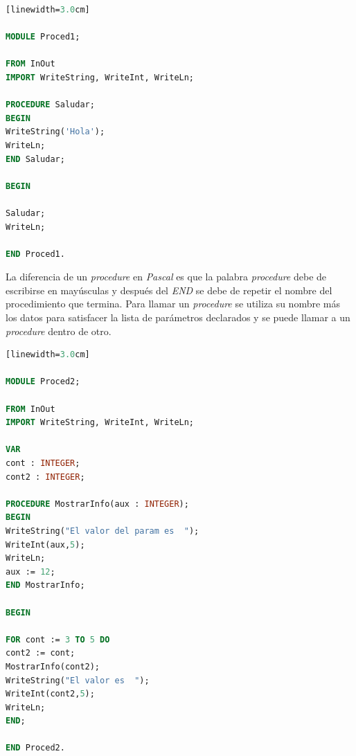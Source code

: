 \documentclass[10pt,journal,compsoc]{IEEEtran}
\begin{document}
\begin{lstlisting}[language=Modula-2, caption = {Sintaxis de un Procedure sin parametros}][linewidth=3.0cm]

MODULE Proced1;

FROM InOut 
IMPORT WriteString, WriteInt, WriteLn;

PROCEDURE Saludar; 
BEGIN 
WriteString('Hola'); 
WriteLn; 
END Saludar;

BEGIN 

Saludar;  
WriteLn; 

END Proced1. 

\end{lstlisting}
La diferencia de un \emph{procedure} en \emph{Pascal} es que la palabra \emph{procedure} debe de escribirse en may\'usculas y despu\'es del \emph{END} se debe de repetir el nombre del procedimiento que termina. Para llamar un \emph{procedure} se utiliza su nombre m\'as los datos para satisfacer la lista de par\'ametros declarados y se puede llamar a un \emph{procedure} dentro de otro.
\begin{lstlisting}[language=Modula-2, caption = {Sintaxis de un Procedure con parametros}][linewidth=3.0cm]

MODULE Proced2;

FROM InOut 
IMPORT WriteString, WriteInt, WriteLn;

VAR 
cont : INTEGER;
cont2 : INTEGER;

PROCEDURE MostrarInfo(aux : INTEGER);
BEGIN
WriteString("El valor del param es  ");
WriteInt(aux,5);
WriteLn;
aux := 12;
END MostrarInfo;

BEGIN 

FOR cont := 3 TO 5 DO
cont2 := cont;
MostrarInfo(cont2);
WriteString("El valor es  ");
WriteInt(cont2,5);
WriteLn;
END;

END Proced2. 

\end{lstlisting}
\end{document}

